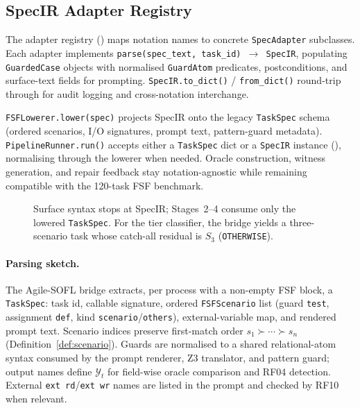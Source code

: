 \subsection{SpecIR Adapter Registry}
\label{sec:impl:specir-adapters}

The adapter registry () maps notation names to
concrete \texttt{SpecAdapter} subclasses.
Each adapter implements \texttt{parse(spec\_text, task\_id) $\to$ SpecIR},
populating \texttt{GuardedCase} objects with normalised \texttt{GuardAtom}
predicates, postconditions, and surface-text fields for prompting.
\texttt{SpecIR.to\_dict()} / \texttt{from\_dict()} round-trip through
 for audit logging and cross-notation
interchange.

\texttt{FSFLowerer.lower(spec)} projects SpecIR onto the legacy
\texttt{TaskSpec} schema (ordered scenarios, I/O signatures, prompt text,
pattern-guard metadata).
\texttt{PipelineRunner.run()} accepts either a \texttt{TaskSpec} dict or a
\texttt{SpecIR} instance (), normalising
through the lowerer when needed.
Oracle construction, witness generation, and repair feedback stay
notation-agnostic while remaining compatible with the 120-task FSF benchmark.

\begin{figure}[t]
  \centering
  \caption{Surface syntax stops at SpecIR; Stages~2--4 consume only the
           lowered \texttt{TaskSpec}.
           For the tier classifier, the bridge yields a three-scenario task
           whose catch-all residual is $S_3$ (\texttt{OTHERWISE}).}
  \label{fig:fsf-parser-class}
\end{figure}

\paragraph{Parsing sketch.}
The Agile-SOFL bridge extracts, per process with a non-empty FSF block, a
\texttt{TaskSpec}: task id, callable signature, ordered
\texttt{FSFScenario} list (guard \texttt{test}, assignment \texttt{def},
kind \texttt{scenario}/\texttt{others}), external-variable map, and rendered
prompt text.
Scenario indices preserve first-match order
$s_1 \succ \cdots \succ s_n$~\citep{dijkstra1975guarded}
(Definition~\ref{def:scenario}).
Guards are normalised to a shared relational-atom syntax consumed by the
prompt renderer, Z3 translator, and pattern guard; output names define
$\mathcal{Y}_t$ for field-wise oracle comparison and RF04 detection.
External \texttt{ext rd}/\texttt{ext wr} names are listed in the prompt and
checked by RF10 when relevant.

